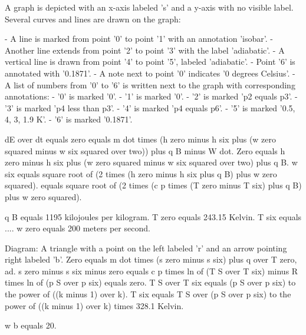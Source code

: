 A graph is depicted with an x-axis labeled 's' and a y-axis with no visible label. Several curves and lines are drawn on the graph:

- A line is marked from point '0' to point '1' with an annotation 'isobar'.
- Another line extends from point '2' to point '3' with the label 'adiabatic'.
- A vertical line is drawn from point '4' to point '5', labeled 'adiabatic'.
- Point '6' is annotated with '0.1871'.
- A note next to point '0' indicates '0 degrees Celsius'.
- A list of numbers from '0' to '6' is written next to the graph with corresponding annotations:
  - '0' is marked '0'.
  - '1' is marked '0'.
  - '2' is marked 'p2 equals p3'.
  - '3' is marked 'p4 less than p3'.
  - '4' is marked 'p4 equals p6'.
  - '5' is marked '0.5, 4, 3, 1.9 K'.
  - '6' is marked '0.1871'.

dE over dt equals zero equals m dot times (h zero minus h six plus (w zero squared minus w six squared over two)) plus q B minus W dot.  
Zero equals h zero minus h six plus (w zero squared minus w six squared over two) plus q B.  
w six equals square root of (2 times (h zero minus h six plus q B) plus w zero squared).  
equals square root of (2 times (c p times (T zero minus T six) plus q B) plus w zero squared).

q B equals 1195 kilojoules per kilogram.  
T zero equals 243.15 Kelvin.  
T six equals ....  
w zero equals 200 meters per second.

Diagram: A triangle with a point on the left labeled 'r' and an arrow pointing right labeled 'b'.  
Zero equals m dot times (s zero minus s six) plus q over T zero, ad.  
s zero minus s six minus zero equals c p times ln of (T S over T six) minus R times ln of (p S over p six) equals zero.  
T S over T six equals (p S over p six) to the power of ((k minus 1) over k).  
T six equals T S over (p S over p six) to the power of ((k minus 1) over k) times 328.1 Kelvin.

w b equals 20.